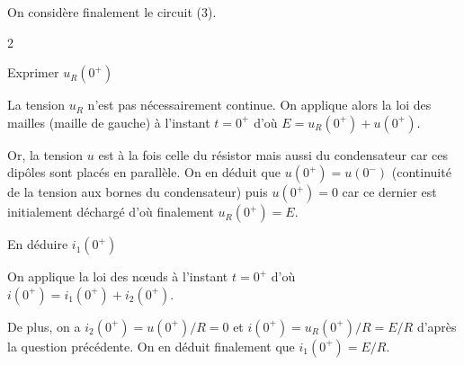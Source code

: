 

\medskip
On considère finalement le circuit (3). 

\begin{multicols}{2}
\begin{enonce}
Exprimer $u_R(0^+)$
\end{enonce}


\begin{corrige}
La tension $u_R$ n'est pas nécessairement continue. On applique alors la loi des mailles (maille de gauche) à l'instant $t=0^+$ d'où $E = u_R(0^+) + u(0^+)$.
\par
Or, la tension $u$ est à la fois celle du résistor mais aussi du condensateur car ces dipôles sont placés en parallèle. On en déduit que $u(0^+) = u(0^-)$ (continuité de la tension aux bornes du condensateur) puis $u(0^+) = 0$ car ce dernier est initialement déchargé d'où finalement $u_R(0^+) = E$.
\end{corrige}




\begin{enonce}
En déduire $i_1(0^+)$
\end{enonce}


\begin{corrige}
On applique la loi des nœuds à l'instant $t=0^+$ d'où $i(0^+) = i_1(0^+)+ i_2(0^+)$. 

De plus, on a $i_2(0^+) = u(0^+)/R = 0$ et $i(0^+)=u_R(0^+)/R = E/R$ d'après la question précédente. 
On en déduit finalement que $i_1(0^+) = E/R$. 
\end{corrige}
\end{multicols}


\finEntrainement


\newpage



